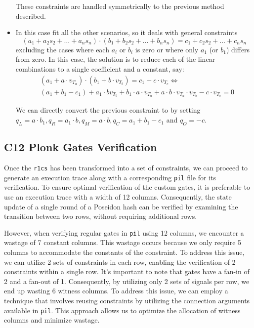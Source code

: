\begin{itemize}
These constraints are handled symmetrically to the previous method described.

\item In this case fit all the other scenarios, so it deals with general constraints 
\[
(a_{1} + a_{2} s_2 + \dots + a_{n} s_n) \cdot (b_{1} + b_{2} s_2 + \dots + b_{n} s_n) = c_{1} + c_{2} s_2 + \dots + c_{n} s_n
\]
excluding the cases where each $a_i$ or $b_i$ is zero or where only $a_1$ (or $b_1$) differs from zero. In this case, the solution is to reduce each of the linear combinations to a single coefficient and a constant, say: 
\begin{align*}
&(a_1 + a \cdot v_{T_a}) \cdot (b_1 + b \cdot v_{T_b}) = c_1 + c \cdot v_{T_c} \Longleftrightarrow \\
&(a_1 + b_1 - c_1) + a_1 \cdot b  v_{T_b} + b_1 \cdot a \cdot v_{T_a} + a \cdot b \cdot v_{T_a} \cdot v_{T_b} - c \cdot v_{T_c} = 0
\end{align*}

We can directly convert the previous constraint to \plonk by setting $q_L = a \cdot b_1, q_R = a_1 \cdot b, q_M = a \cdot b, q_C = a_1 + b_1 - c_1$ and $q_O = -c$.  

\end{itemize}



\subsection{C12 Plonk Gates Verification}

Once the \texttt{r1cs} has been transformed into a set of \plonk constraints, we can proceed to generate an execution trace along with a corresponding \texttt{pil} file for its verification. To ensure optimal verification of the \POSEIDON custom gates, it is preferable to use an execution trace with a width of 12 columns. Consequently, the state update of a single round of a Poseidon hash can be verified by examining the transition between two rows, without requiring additional rows. 

However, when verifying regular \plonk gates in \texttt{pil} using 12 columns, we encounter a wastage of 7 constant columns. This wastage occurs because we only require 5 columns to accommodate the constants of the constraint. To address this issue, we can utilize 2 sets of constraints in each row, enabling the verification of 2 \plonk constraints within a single row. It's important to note that \plonk gates have a fan-in of 2 and a fan-out of 1. Consequently, by utilizing only 2 sets of signals per row, we end up wasting 6 witness columns. To address this issue, we can employ a technique that involves reusing constraints by utilizing the connection arguments available in \texttt{pil}. This approach allows us to optimize the allocation of witness columns and minimize wastage. 

